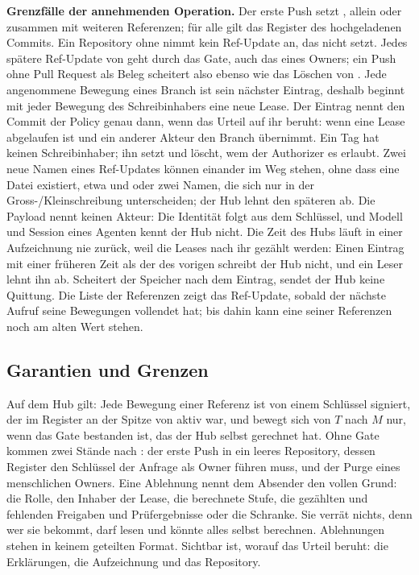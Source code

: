 \startinfobox
{\bf Grenzfälle der annehmenden Operation.}
Der erste Push setzt , allein oder zusammen mit weiteren Referenzen; für alle gilt
das Register des hochgeladenen Commits.
Ein Repository ohne  nimmt kein Ref-Update an, das  nicht setzt.
Jedes spätere Ref-Update von  geht durch das Gate, auch das eines Owners; ein Push
ohne Pull Request als Beleg scheitert also ebenso wie das Löschen von .
Jede angenommene Bewegung eines Branch ist sein nächster Eintrag, deshalb beginnt mit jeder
Bewegung des Schreibinhabers eine neue Lease.
Der Eintrag nennt den Commit der Policy genau dann, wenn das Urteil auf ihr beruht: wenn eine
Lease abgelaufen ist und ein anderer Akteur den Branch übernimmt.
Ein Tag hat keinen Schreibinhaber; ihn setzt und löscht, wem der Authorizer es erlaubt.
Zwei neue Namen eines Ref-Updates können einander im Weg stehen, ohne dass eine Datei existiert,
etwa  und  oder zwei Namen, die sich nur in der
Gross-/Kleinschreibung unterscheiden; der Hub lehnt den späteren ab.
Die Payload nennt keinen Akteur: Die Identität folgt aus dem Schlüssel, und Modell und Session
eines Agenten kennt der Hub nicht.
Die Zeit des Hubs läuft in einer Aufzeichnung nie zurück, weil die Leases nach ihr gezählt
werden: Einen Eintrag mit einer früheren Zeit als der des vorigen schreibt der Hub nicht, und
ein Leser lehnt ihn ab.
Scheitert der Speicher nach dem Eintrag, sendet der Hub keine Quittung.
Die Liste der Referenzen zeigt das Ref-Update, sobald der nächste Aufruf seine Bewegungen
vollendet hat; bis dahin kann eine seiner Referenzen noch am alten Wert stehen.
\stopinfobox

\subsection{Garantien und Grenzen}

Auf dem Hub gilt: Jede Bewegung einer Referenz ist von einem Schlüssel signiert, der im Register
an der Spitze von  aktiv war, und  bewegt sich von $T$ nach $M$ nur, wenn
das Gate bestanden ist, das der Hub selbst gerechnet hat.
Ohne Gate kommen zwei Stände nach : der erste Push in ein leeres Repository, dessen
Register den Schlüssel der Anfrage als Owner führen muss, und der Purge eines menschlichen
Owners.
Eine Ablehnung nennt dem Absender den vollen Grund: die Rolle, den Inhaber der Lease, die
berechnete Stufe, die gezählten und fehlenden Freigaben und Prüfergebnisse oder die Schranke.
Sie verrät nichts, denn wer sie bekommt, darf lesen und könnte alles selbst berechnen.
Ablehnungen stehen in keinem geteilten Format.
Sichtbar ist, worauf das Urteil beruht: die Erklärungen, die Aufzeichnung und das Repository.

